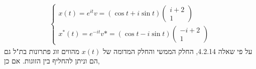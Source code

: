 \documentclass{article}
\begin{document}
\begin{align*}
    \begin{cases}
        x(t)=e^{it}v=(\cos t + i\sin t)\begin{pmatrix}
                                           i+2 \\
                                           1
                                       \end{pmatrix} \\
        x^{\ast}(t)=e^{-it}v*=(\cos t - i\sin t)\begin{pmatrix}
                                                    -i+2 \\
                                                    1
                                                \end{pmatrix}
    \end{cases}
\end{align*}
על פי שאלה 4.2.14, החלק הממשי והחלק המדומה של $x(t)$ מהווים זוג פתרונות בת"ל גם הם וניתן להחליף בין הזוגות. אם כן,
\end{document}
